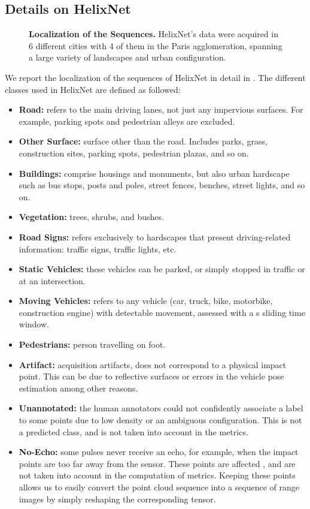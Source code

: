 \documentclass[runningheads]{tpls/llncs}
\begin{document}
\subsection{Details on HelixNet}\label{sec:details_helixnet}
\begin{figure}
    \centering
    \hfill
    \caption{{\bf Localization of the Sequences.} HelixNet's data were acquired in 6 different cities with 4 of them in the Paris agglomeration, spanning a large variety of landscapes and urban configuration.}
    \label{fig:france}
\end{figure}
 We report the localization of the sequences of HelixNet in detail in . The different classes used in HelixNet are defined as followed:
 \begin{itemize}
     \item {\bf Road:} refers to the main driving lanes, not just any impervious surfaces. For example, parking spots and pedestrian alleys are excluded.
     \item {\bf Other Surface:} surface other than the road. Includes parks, grass, construction sites, parking spots, pedestrian plazas, and so on.
     \item {\bf Buildings:} comprise housings and monuments, but also urban hardscape such as bus stops, posts and poles, street fences, benches, street lights, and so on.
     \item {\bf Vegetation:} trees, shrubs, and bushes.
     \item {\bf Road Signs:} refers exclusively to hardscapes that present driving-related information: traffic signs, traffic lights, etc.
     \item {\bf Static Vehicles:} these vehicles can be parked, or simply stopped in traffic or at an intersection.
     \item {\bf Moving Vehicles:} refers to any vehicle (car, truck, bike, motorbike, construction engine) with detectable movement, assessed with a s sliding time window.
     \item {\bf Pedestrians:} person travelling on foot. 
     \item {\bf Artifact:} acquisition artifacts, does not correspond to a physical impact point. This can be due to reflective surfaces or errors in the vehicle pose estimation among other reasons.
     \item {\bf Unannotated:} the human annotators could not confidently associate a label to some points due to low density or an ambiguous configuration. This is not a predicted class, and is not taken into account in the metrics.
     \item {\bf No-Echo:} some pulses never receive an echo, for example, when the impact points are too far away from the sensor. These points are affected , and are not taken into account in the computation of metrics. Keeping these points allows us to easily convert the point cloud sequence into a sequence of range images by simply reshaping the corresponding tensor.
 \end{itemize}
\end{document}
